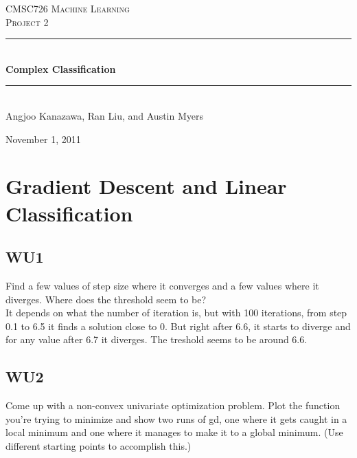 \documentclass[a4paper,11pt]{article}
\newcommand{\HRule}{\rule{\linewidth}{0.5mm}}
\begin{document}
\begin{titlepage}
\begin{center}

\textsc{\LARGE CMSC726 Machine Learning}\\[1.5cm]

\textsc{\Large Project 2}\\[0.5cm]

\HRule \\[0.5cm]

{ \huge \bfseries Complex Classification}\\[0.4cm]

\HRule \\[1.5cm]

{\large Angjoo Kanazawa, Ran Liu, and Austin Myers}

\vfill

{\large November 1, 2011}

\end{center}
\end{titlepage}
{}

\section{Gradient Descent and Linear Classification}
\subsection{WU1}
\textsf{Find a few values of step size where it converges and a few
  values where it diverges. Where does the threshold seem to be?}\\

It depends on what the number of iteration is, but with 100
iterations, from step 0.1 to 6.5 it finds a solution close to
0. But right after 6.6, it starts to diverge and for any value after
6.7 it diverges. The treshold seems to be around 6.6.

\subsection{WU2}
\textsf{Come up with a non-convex univariate optimization
  problem. Plot the function you're trying to minimize and show two
  runs of gd, one where it gets caught in a local minimum and one
  where it manages to make it to a global minimum. (Use different
  starting points to accomplish this.)}\\
\end{document}
